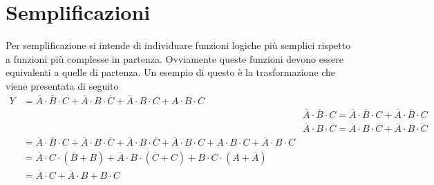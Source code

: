 \section{Semplificazioni}
\label{sec:SEMPLIFICAZIONILOGICHE}
Per semplificazione si intende di individuare funzioni logiche più semplici rispetto a funzioni più complesse in partenza. Ovviamente queste funzioni devono essere equivalenti a quelle di partenza. Un esempio di questo è la trasformazione che viene presentata di seguito %
	\begin{align*}
	Y&=\overline{A}\cdot \overline{B}\cdot C+\overline{A}\cdot B\cdot \overline{C}+\overline{A}\cdot B\cdot C+A\cdot B\cdot C\\
	&&\overline{A}\cdot \overline{B} \cdot C=\overline{A}\cdot  \overline{B}\cdot C+\overline{A}\cdot \overline{B}\cdot C\\
	&&\overline{A}\cdot B\cdot \overline{C}=\overline{A}\cdot B\cdot \overline{C}+\overline{A}\cdot B\cdot\overline{C}\\
	&=\overline{A}\cdot \overline{B}\cdot C+\overline{A}\cdot B\cdot \overline{C}+\overline{A}\cdot B\cdot \overline{C}+\overline{A}\cdot B\cdot C+A\cdot B\cdot C+\overline{A}\cdot B\cdot C\\
	&=\overline{A}\cdot C\cdot (\overline{B}+B)+\overline{A}\cdot B\cdot (\overline{C}+C)+B\cdot C\cdot (A+\overline{A})\\
	&=\overline{A}\cdot C+\overline{A}\cdot B+B\cdot C\\
	\end{align*}
